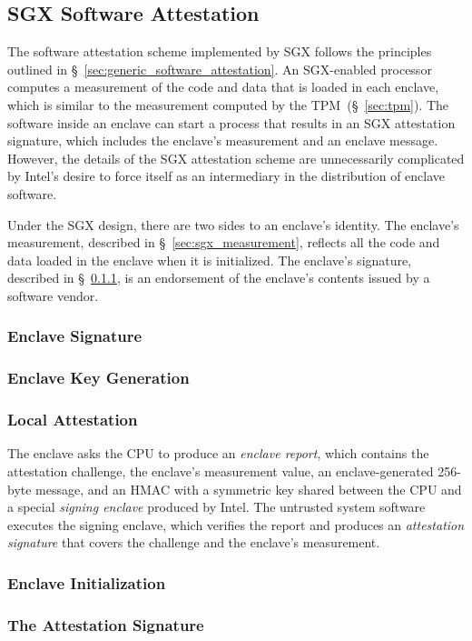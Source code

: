 \subsection{SGX Software Attestation}
\label{sec:sgx_attestation}

The software attestation scheme implemented by SGX follows the principles
outlined in \S~\ref{sec:generic_software_attestation}. An SGX-enabled processor
computes a measurement of the code and data that is loaded in each enclave,
which is similar to the measurement computed by the TPM~(\S~\ref{sec:tpm}). The
software inside an enclave can start a process that results in an SGX
attestation signature, which includes the enclave's measurement and an enclave
message. However, the details of the SGX attestation scheme are unnecessarily
complicated by Intel's desire to force itself as an intermediary in the
distribution of enclave software.

Under the SGX design, there are two sides to an enclave's identity. The
enclave's measurement, described in \S~\ref{sec:sgx_measurement}, reflects all
the code and data loaded in the enclave when it is initialized. The enclave's
signature, described in \S~\ref{sec:sgx_sigstruct}, is an endorsement of the
enclave's contents issued by a software vendor.




\subsubsection{Enclave Signature}
\label{sec:sgx_sigstruct}
\label{sec:sgx_mrsigner}


\subsubsection{Enclave Key Generation}
\label{sec:sgx_egetkey}


\subsubsection{Local Attestation}

The enclave asks the CPU to produce an \textit{enclave report}, which contains
the attestation challenge, the enclave's measurement value, an
enclave-generated 256-byte message, and an HMAC
 with a symmetric key shared between the CPU and a special
\textit{signing enclave} produced by Intel. The untrusted system software
executes the signing enclave, which verifies the report and produces an
\textit{attestation signature} that covers the challenge and the enclave's
measurement.


\subsubsection{Enclave Initialization}
\label{sec:sgx_einit}



\subsubsection{The Attestation Signature}
\label{sec:sgx_attestation_signature}

